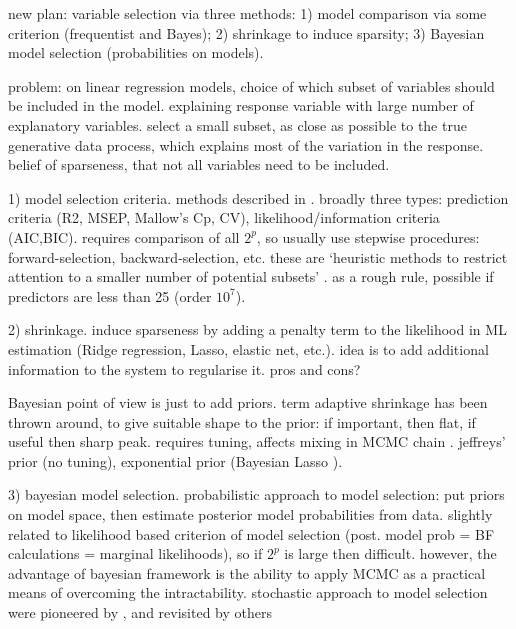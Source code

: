 \documentclass[a4paper,showframe,11pt]{report}
\begin{document}

\newpage
new plan: variable selection via three methods: 1) model comparison via some criterion (frequentist and Bayes); 2) shrinkage to induce sparsity; 3) Bayesian model selection (probabilities on models).

problem: on linear regression models, choice of which subset of variables should be included in the model.
explaining response variable with large number of explanatory variables.
select a small subset, as close as possible to the true generative data process, which explains most of the variation in the response.
belief of sparseness, that not all variables need to be included.

1) model selection criteria. methods described in \citep{miller2002subset}. broadly three types: prediction criteria (R2, MSEP, Mallow's Cp, CV), likelihood/information criteria (AIC,BIC). requires comparison of all $2^p$, so usually use stepwise procedures: forward-selection, backward-selection, etc. these are `heuristic methods to restrict attention to a smaller number of potential subsets' \citep{George1993}. as a rough rule, possible if predictors are less than 25 (order $10^7$).

2) shrinkage. induce sparseness by adding a penalty term to the likelihood in ML estimation (Ridge regression, Lasso, elastic net, etc.). idea is to add additional information to the system to regularise it. pros and cons?

Bayesian point of view is just to add priors.  term adaptive shrinkage has been thrown around, to give suitable shape to the prior: if important, then flat, if useful then sharp peak. requires tuning, affects mixing in MCMC chain \citep{OHara2009}. jeffreys' prior (no tuning), exponential prior (Bayesian Lasso \citep{park2008bayesian}).


3) bayesian model selection. probabilistic approach to model selection: put priors on model space, then estimate posterior model probabilities from data. slightly related to likelihood based criterion of model selection (post. model prob = BF calculations = marginal likelihoods), so if $2^p$ is large then difficult. however, the advantage of bayesian framework is the ability to apply MCMC as a practical means of overcoming the intractability. stochastic approach to model selection were pioneered by \citep{George1993}, and revisited by others \citep{Kuo1998,dellaportas2002bayesian,Ntzoufras2008}
\end{document}
